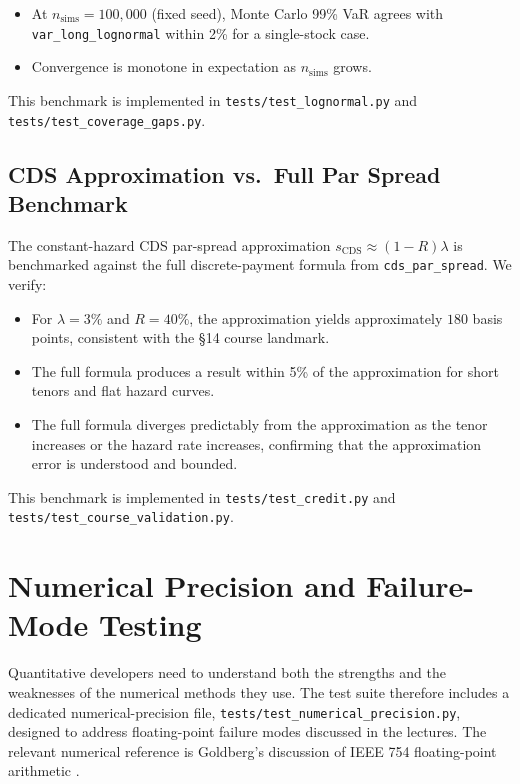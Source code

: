 \documentclass[11pt]{article}
\newcommand{\code}[1]{\texttt{#1}}
\begin{document}
\begin{itemize}
  \item At $n_{\mathrm{sims}} = 100{,}000$ (fixed seed), Monte Carlo 99\%
    VaR agrees with \code{var\_long\_lognormal} within 2\% for a
    single-stock case.
  \item Convergence is monotone in expectation as $n_{\mathrm{sims}}$ grows.
\end{itemize}

This benchmark is implemented in \code{tests/test\_lognormal.py} and
\code{tests/test\_coverage\_gaps.py}.

\subsection{CDS Approximation vs.\ Full Par Spread Benchmark}

The constant-hazard CDS par-spread approximation
$s_{\mathrm{CDS}} \approx (1-R)\lambda$ is benchmarked against the
full discrete-payment formula from \code{cds\_par\_spread}.  We verify:

\begin{itemize}
  \item For $\lambda = 3\%$ and $R = 40\%$, the approximation yields
    approximately $180$ basis points, consistent with the §14 course landmark.
  \item The full formula produces a result within 5\% of the approximation
    for short tenors and flat hazard curves.
  \item The full formula diverges predictably from the approximation
    as the tenor increases or the hazard rate increases, confirming
    that the approximation error is understood and bounded.
\end{itemize}

This benchmark is implemented in \code{tests/test\_credit.py} and
\code{tests/test\_course\_validation.py}.

\section{Numerical Precision and Failure-Mode Testing}
\label{sec:numerical-precision-failure-mode}

Quantitative developers need to understand both the strengths and the
weaknesses of the numerical methods they use.  The test suite therefore
includes a dedicated numerical-precision file,
\code{tests/test\_numerical\_precision.py}, designed to address floating-point
failure modes discussed in the lectures.  The relevant numerical reference
is Goldberg's discussion of IEEE 754 floating-point arithmetic \cite{Gol91}.
\end{document}
